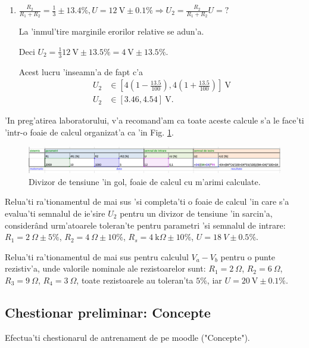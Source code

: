 \begin{example}[]
\begin{enumerate}
\item \textcolor{Bittersweet}{$\frac{R_2}{R_1+R_2} = \frac{1}{3} \pm 13.4\%, U=12~\mathrm{V}\pm0.1\% \Longrightarrow U_2 = \frac{R_2}{R_1+R_2}U=?$}

La 'inmul'tire marginile erorilor relative se adun'a.

Deci $U_2 = \frac{1}{3}12~\mathrm{V} \pm 13.5\% = 4~\mathrm{V} \pm 13.5\%$.

Acest lucru 'inseamn'a de fapt c'a 
\begin{align*}
U_2 &\in \left[4\left(1-\frac{13.5}{100}\right), 4\left(1+\frac{13.5}{100}\right)\right]~\mathrm{V} \\
U_2 &\in \left[3.46, 4.54\right]~\mathrm{V}.
\end{align*}
\end{enumerate}
\end{example}

'In preg'atirea laboratorului, v'a recomand'am ca toate aceste calcule s'a le face'ti 'intr-o foaie de calcul organizat'a ca 'in Fig. \ref{fig:divizor_tensiune_excel1}.

\begin{figure}
	\centering
		\includegraphics[width=1\textwidth]{laborator_01/figuri/divizor_tensiune_excel1}
	\caption{Divizor de tensiune 'in gol, foaie de calcul cu m'arimi calculate.}
	 \label{fig:divizor_tensiune_excel1}
\end{figure}

\begin{exercise}%
  Relua'ti ra'tionamentul de mai sus 'si completa'ti o foaie de calcul 'in care s'a evalua'ti semnalul de ie'sire $U_2$ pentru un divizor de tensiune 'in sarcin'a, consider\^and urm'atoarele toleran'te pentru parametri 'si semnalul de intrare: $R_1 = 2~\Omega\pm5\%$, $R_2 = 4~\Omega\pm10\%$, $R_s = 4~\mathrm{k}\Omega\pm10\%$, $U = 18~V\pm0.5\%$.
\end{exercise}
\begin{exercise}%
  Relua'ti ra'tionamentul de mai sus pentru calculul $V_a-V_b$ pentru o punte rezistiv'a, unde valorile nominale ale rezistoarelor sunt: $R_1 = 2~\Omega$, $R_2 = 6~\Omega$, $R_3 = 9~\Omega$, $R_4 = 3~\Omega$, toate rezistoarele au toleran'ta $5\%$, iar $U = 20~\mathrm{V}\pm0.1\%$.
\end{exercise}

\subsection*{Chestionar preliminar:  Concepte}


\begin{exercise}%
Efectua'ti chestionarul de antrenament de pe moodle ("Concepte").
\end{exercise}